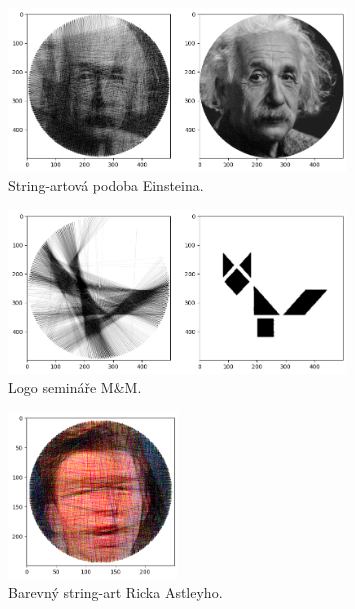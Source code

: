 \documentclass{article}
\begin{document}
\begin{figure}[!ht]
	\centering
	\includegraphics[width=0.8\textwidth]{einstein.png}
	\caption{String-artová podoba Einsteina.}
	\label{fig:einstein}
\end{figure}

\begin{figure}[!ht]
	\centering
	\includegraphics[width=0.8\textwidth]{logo.png}
	\caption{Logo semináře M\&M.}
	\label{fig:logo}
\end{figure}

\begin{figure}[!ht]
	\centering
	\includegraphics[width=0.4\textwidth]{rgb_rick.png}
	\caption{Barevný string-art Ricka Astleyho.}
	\label{fig:rgb_rick}
\end{figure}
\end{document}
